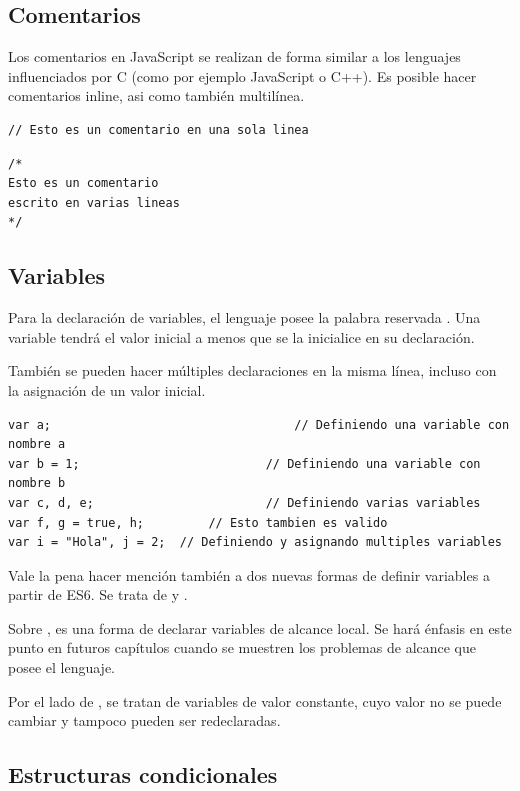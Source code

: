 \subsection{Comentarios}

Los comentarios en JavaScript se realizan de forma similar a los lenguajes influenciados por C (como por ejemplo JavaScript o C++). Es posible hacer comentarios inline, asi como también multilínea.

\begin{lstlisting}[title={Comentario inline}]
// Esto es un comentario en una sola linea
\end{lstlisting}

\begin{lstlisting}[title={Comentario multilinea}]
/* 
Esto es un comentario
escrito en varias lineas
*/
\end{lstlisting}

\subsection{Variables}

Para la declaración de variables, el lenguaje posee la palabra reservada . Una variable tendrá el valor inicial  a menos que se la inicialice en su declaración.

También se pueden hacer múltiples declaraciones en la misma línea, incluso con la asignación de un valor inicial.

\begin{lstlisting}[title={Declarando variables}]
var a;									// Definiendo una variable con nombre a
var b = 1; 	 						// Definiendo una variable con nombre b
var c, d, e;	 					// Definiendo varias variables
var f, g = true, h;			// Esto tambien es valido
var i = "Hola", j = 2;	// Definiendo y asignando multiples variables
\end{lstlisting}

Vale la pena hacer mención también a dos nuevas formas de definir variables a partir de ES6. Se trata de  y .

Sobre , es una forma de declarar variables de alcance local. Se hará énfasis en este punto en futuros capítulos cuando se muestren los problemas de alcance que posee el lenguaje.

Por el lado de , se tratan de variables de valor constante, cuyo valor no se puede cambiar y tampoco pueden ser redeclaradas.

\subsection{Estructuras condicionales}

